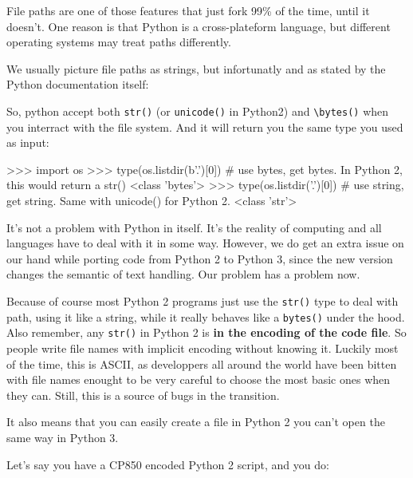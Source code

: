 File paths are one of those features that just fork 99\% of the time, until it doesn't. One reason is that Python is a cross-plateform language, but different operating systems may treat paths differently.

We usually picture file paths as strings, but infortunatly and as stated by the Python documentation itself: 

So, python accept both \lstinline{str()} (or \lstinline{unicode()} in Python2) and \lstinline{\bytes()} when you interract with the file system. And it will return you the same type you used as input:

\begin{py3}
>>> import os
>>> type(os.listdir(b'.')[0]) # use bytes, get bytes. In Python 2, this would return a str()
<class 'bytes'>
>>> type(os.listdir('.')[0]) # use string, get string. Same with unicode() for Python 2.
<class 'str'>
\end{py3}

It's not a problem with Python in itself. It's the reality of computing and all languages have to deal with it in some way.  However, we do get an extra issue on our hand while porting code from Python 2 to Python 3, since the new version changes the semantic of text handling. Our problem has a problem now.

Because of course most Python 2 programs just use the \lstinline{str()} type to deal with path, using it like a string, while it really behaves like a \lstinline{bytes()} under the hood. Also remember, any \lstinline{str()} in Python 2 is \textbf{in the encoding of the code file}. So people write file names with implicit encoding without knowing it. Luckily most of the time, this is ASCII, as developpers all around the world have been bitten with file names enought to be very careful to choose the most basic ones when they can. Still, this is a source of bugs in the transition.

It also means that you can easily create a file in Python 2 you can't open the same way in Python 3.

Let's say you have a CP850 encoded Python 2 script, and you do:


